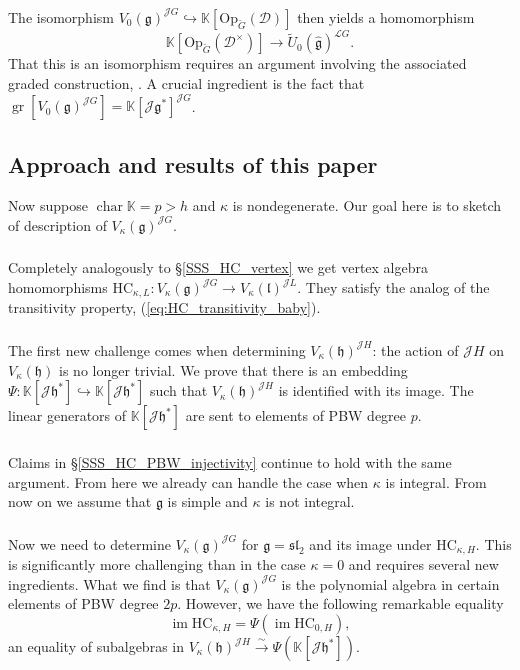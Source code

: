 \documentclass{amsart}
\theoremstyle{definition}
\newcommand{\sss}{\subsubsection{}}
\newcommand{\D}{\sD}
\newcommand{\sD}{\mathscr{D}}
\newcommand{\on}{\mathrm}
\newcommand{\g}{\mathfrak{g}}
\newcommand{\hg}{\hat{\mathfrak{g}}}
\newcommand{\gr}{\operatorname{gr}}
\newcommand{\h}{\mathfrak{h}}
\newcommand{\HC}{\mathrm{HC}} %
\newcommand{\lf}{\mathfrak{l}}
\newcommand{\Jet}{\mathscr{J}}
\newcommand{\Loop}{\mathscr{L}}
\newcommand{\Op}{\on{Op}}
\newcommand{\bK}{\mathbb{K}}
\renewcommand{\bK}{\mathbb{K}} %
\numberwithin{equation}{section}
\begin{document}
\sss\label{SSS_from_V_to_U_intro} The isomorphism $V_0(\g)^{\Jet G}\hookrightarrow \bK[\Op_{\check{G}}(\D)]$ then yields 
a homomorphism $$\bK[\Op_{\check{G}}(\D^\times)]\rightarrow \widetilde{U}_0(\hg)^{\Loop G}.$$ That this is an isomorphism requires an argument involving the associated graded construction, \cite[Sec. 4.3]{Frenkel_loop}. A crucial ingredient is the fact that $\gr[V_0(\g)^{\Jet G}]=\bK[\Jet\g^*]^{\Jet G}$.



\subsection{Approach and results of this paper} \label{s:maintheorem}
Now suppose $\operatorname{char}\bK=p>h$ and $\kappa$ is nondegenerate. Our goal here is to sketch of description of $V_\kappa(\g)^{\Jet G}$. 

\sss Completely analogously to \S\ref{SSS_HC_vertex}  we  get vertex algebra homomorphisms
$\HC_{\kappa,L}:V_\kappa(\g)^{\Jet G}\rightarrow V_\kappa(\lf)^{\Jet L}$. They satisfy the analog of the transitivity property, (\ref{eq:HC_transitivity_baby}).

\sss The first new challenge comes when determining 
$V_\kappa(\h)^{\Jet H}$: the action of $\Jet H$ on $V_\kappa(\h)$ is no longer trivial. We prove that there is an embedding 
$\Psi:\bK[\Jet\h^*]\hookrightarrow \bK[\Jet\h^*]$ such that $V_\kappa(\h)^{\Jet H}$ is identified with its image. The linear generators of $\bK[\Jet\h^*]$ are sent to elements of PBW degree $p$.

\sss Claims in \S\ref{SSS_HC_PBW_injectivity} continue to hold with the same argument. From here we already can handle the case when $\kappa$ is integral. From now on we assume that $\g$ is simple and $\kappa$ is not integral. 

\sss Now we need to determine $V_\kappa(\g)^{\Jet G}$ for $\g=\mathfrak{sl}_2$
and its image under $\HC_{\kappa,H}$. This is significantly more challenging than in the case $\kappa=0$ and requires several new ingredients. What we find is that $V_\kappa(\g)^{\Jet G}$
is the polynomial algebra in certain elements of PBW degree $2p$. However, we  have the following remarkable equality
\begin{equation}\label{eq:images_sl2_coincidence}
\operatorname{im}\HC_{\kappa,H}=\Psi(\operatorname{im}\HC_{0,H}),
\end{equation} an equality of subalgebras in $V_\kappa(\h)^{\Jet H}\xrightarrow{\sim}\Psi(\bK[\Jet \h^*])$. 
\end{document}
